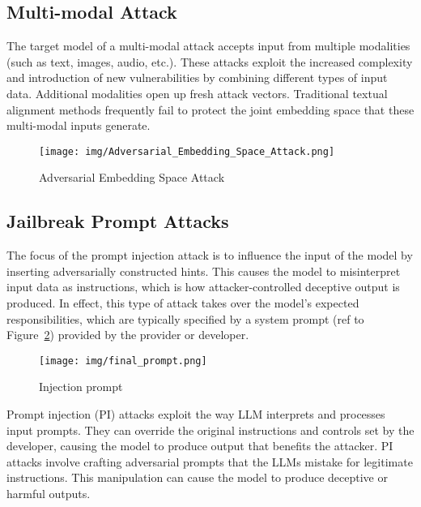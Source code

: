 \subsection{Multi-modal Attack}
The target model of a multi-modal attack accepts input from multiple modalities (such as text, images, audio, etc.)\cite{girdhar2023imagebind}. These attacks exploit the increased complexity and introduction of new vulnerabilities by combining different types of input data. Additional modalities open up fresh attack vectors. Traditional textual alignment methods frequently fail to protect the joint embedding space that these multi-modal inputs generate.
\begin{figure}[htbp]
    \centering
    \texttt{[image: img/Adversarial\_Embedding\_Space\_Attack.png]}
    \caption{Adversarial Embedding Space Attack\cite{russinovich2024great}}
    \label{fig:embedding_space_attack}
\end{figure}

\subsection{Jailbreak Prompt Attacks}
The focus of the prompt injection attack is to influence the input of the model by inserting adversarially constructed hints.  This causes the model to misinterpret input data as instructions, which is how attacker-controlled deceptive output is produced.  In effect, this type of attack takes over the model's expected responsibilities, which are typically specified by a system prompt (ref to Figure~\ref{fig:injection_prompt}) provided by the provider or developer.  
\begin{figure}[htbp]
    \centering
    \texttt{[image: img/final\_prompt.png]}
    \caption{Injection prompt\cite{shayegani2023survey}}
    \label{fig:injection_prompt}
\end{figure}

 Prompt injection (PI) attacks exploit the way LLM interprets and processes input prompts. They can override the original instructions and controls set by the developer, causing the model to produce output that benefits the attacker\cite{glukhov2023llm}. PI attacks involve crafting adversarial prompts that the LLMs mistake for legitimate instructions. This manipulation can cause the model to produce deceptive or harmful outputs.



